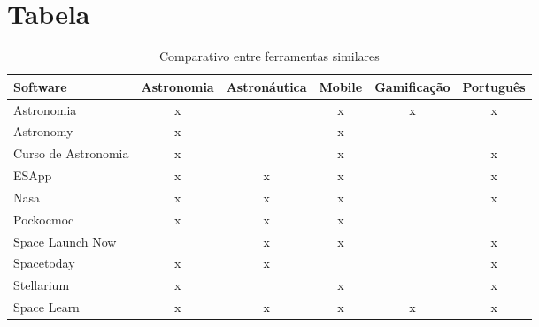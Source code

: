 \section{Tabela}

\begin{table}[ht]
  \caption{Comparativo entre ferramentas similares}
  \label{Tab: Comparativo EA}
  \centering
  
  \begin{tabularx}{\textwidth}{p{4.4cm} ccccc}
    \hline
    \footnotesize\bfseries{Software} & \footnotesize\bfseries{Astronomia}   & \footnotesize\bfseries{Astronáutica}  & \footnotesize\bfseries{Mobile}  & \footnotesize\bfseries{Gamificação} & \footnotesize\bfseries{Português}\\
    \hline
    
        \footnotesize{Astronomia}              & x &   & x & x & x \\
        \footnotesize{Astronomy}               & x &   & x &   &   \\
        \footnotesize{Curso de Astronomia}     & x &   & x &   & x \\
        \footnotesize{ESApp}                   & x & x & x &   & x \\
        \footnotesize{Nasa}                    & x & x & x &   & x \\
        \footnotesize{Pockocmoc}               & x & x & x &   &   \\
        \footnotesize{Space Launch Now}        &   & x & x &   & x \\
        \footnotesize{Spacetoday}              & x & x &   &   & x \\
        \footnotesize{Stellarium}              & x &   & x &   & x \\
        \footnotesize{Space Learn}             & x & x & x & x & x \\ 
   
    \hline
  \end{tabularx}

\end{table}




